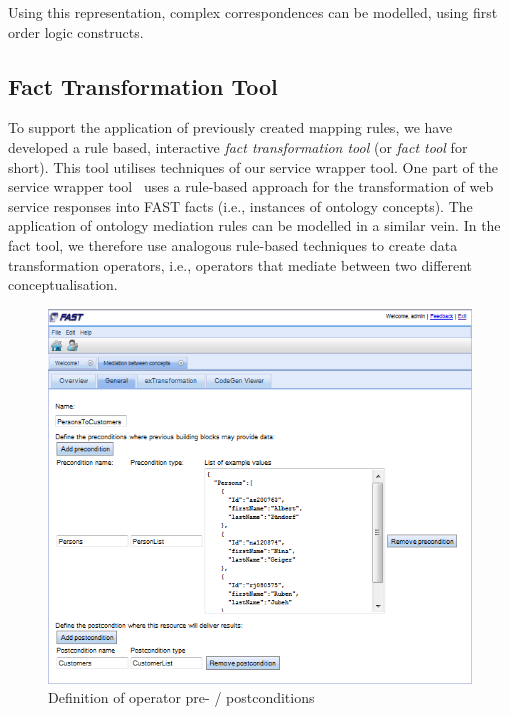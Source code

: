 Using this representation, complex correspondences can be modelled, using first order logic constructs.

\subsection{Fact Transformation Tool}
\label{sec:fact_tool}

To support the application of previously created mapping rules, we have developed a rule based, interactive \emph{fact transformation tool} (or \emph{fact tool} for short). This tool utilises techniques of our service wrapper tool. One part of the service wrapper tool~\cite{rivera2011connecting} uses a rule-based approach for the transformation of web service responses into FAST facts (i.e., instances of ontology concepts). The application of ontology mediation rules can be modelled in a similar vein. In the fact tool, we therefore use analogous rule-based techniques to create data transformation operators, i.e., operators that mediate between two different conceptualisation.

\begin{figure}
    \centering
    \includegraphics[width=0.8\linewidth]{images/GVSMediationToolPreconditions.png}
    \caption{Definition of operator pre- / postconditions}
    \label{fig:FactsTransformationToolPortDefinitions}
\end{figure}

